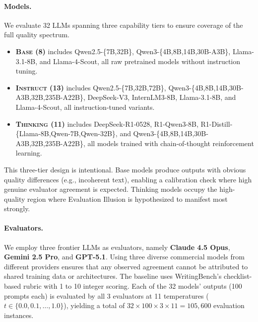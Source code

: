 \documentclass{article}
\begin{document}
\paragraph{Models.} We evaluate 32 LLMs spanning three capability tiers to ensure coverage of the full quality spectrum.
\begin{itemize}
    \item \textsc{\textbf{\textcolor[HTML]{8ECAE6}{Base (8)}}} includes Qwen2.5-\{7B,32B\}, Qwen3-\{4B,8B,14B,30B-A3B\}, Llama-3.1-8B, and Llama-4-Scout, all raw pretrained models without instruction tuning.
    \item \textsc{\textbf{\textcolor[HTML]{219EBC}{Instruct (13)}}} includes Qwen2.5-\{7B,32B,72B\}, Qwen3-\{4B,8B,14B,30B-A3B,32B,235B-A22B\}, DeepSeek-V3, InternLM3-8B, Llama-3.1-8B, and Llama-4-Scout, all instruction-tuned variants.
    \item \textsc{\textbf{\textcolor[HTML]{023047}{Thinking (11)}}} includes DeepSeek-R1-0528, R1-Qwen3-8B, R1-Distill-\{Llama-8B,Qwen-7B,Qwen-32B\}, and Qwen3-\{4B,8B,14B,30B-A3B,32B,235B-A22B\}, all models trained with chain-of-thought reinforcement learning.
\end{itemize}

This three-tier design is intentional. Base models produce outputs with obvious quality differences (e.g., incoherent text), enabling a calibration check where high genuine evaluator agreement is expected. Thinking models occupy the high-quality region where Evaluation Illusion is hypothesized to manifest most strongly.

\paragraph{Evaluators.} We employ three frontier LLMs as evaluators, namely \textbf{Claude 4.5 Opus}, \textbf{Gemini 2.5 Pro}, and \textbf{GPT-5.1}. Using three diverse commercial models from different providers ensures that any observed agreement cannot be attributed to shared training data or architectures. The baseline uses WritingBench's checklist-based rubric with 1 to 10 integer scoring. Each of the 32 models' outputs (100 prompts each) is evaluated by all 3 evaluators at 11 temperatures ($t \in \{0.0, 0.1, \ldots, 1.0\}$), yielding a total of $32 \times 100 \times 3 \times 11 = 105{,}600$ evaluation instances.
\end{document}
